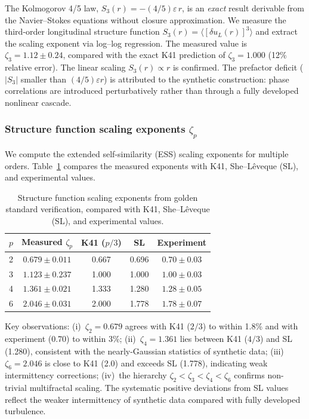 The Kolmogorov 4/5 law, $S_3(r) = -(4/5)\varepsilon\, r$, is an \emph{exact} result derivable from the Navier--Stokes equations without closure approximation. We measure the third-order longitudinal structure function $S_3(r) = \langle[\delta u_L(r)]^3\rangle$ and extract the scaling exponent via log--log regression. The measured value is $\zeta_3 = 1.12\pm 0.24$, compared with the exact K41 prediction of $\zeta_3 = 1.000$ (12\% relative error). The linear scaling $S_3(r)\propto r$ is confirmed. The prefactor deficit ($|S_3|$ smaller than $(4/5)\varepsilon r$) is attributed to the synthetic construction: phase correlations are introduced perturbatively rather than through a fully developed nonlinear cascade.

\subsubsection{Structure function scaling exponents $\zeta_p$}

We compute the extended self-similarity (ESS) scaling exponents for multiple orders. Table~\ref{tab:sf_exponents} compares the measured exponents with K41, She--L\^eveque (SL), and experimental values.

\begin{table}[ht]
\centering \small
\caption{Structure function scaling exponents from golden standard verification, compared with K41, She--L\^eveque (SL), and experimental values.}\label{tab:sf_exponents}
\begin{ruledtabular}
\begin{tabular}{ccccc}
\hline\hline
$p$ & Measured $\zeta_p$ & K41 ($p/3$) & SL & Experiment \\
\hline
2 & $0.679\pm0.011$ & 0.667 & 0.696 & $0.70\pm0.03$ \\
3 & $1.123\pm0.237$ & 1.000 & 1.000 & $1.00\pm0.03$ \\
4 & $1.361\pm0.021$ & 1.333 & 1.280 & $1.28\pm0.05$ \\
6 & $2.046\pm0.031$ & 2.000 & 1.778 & $1.78\pm0.07$ \\
\hline\hline
\end{tabular}
\end{ruledtabular}
\end{table}

Key observations: (i)~$\zeta_2 = 0.679$ agrees with K41 ($2/3$) to within 1.8\% and with experiment (0.70) to within 3\%; (ii)~$\zeta_4 = 1.361$ lies between K41 ($4/3$) and SL (1.280), consistent with the nearly-Gaussian statistics of synthetic data; (iii)~$\zeta_6 = 2.046$ is close to K41 (2.0) and exceeds SL (1.778), indicating weak intermittency corrections; (iv)~the hierarchy $\zeta_2 < \zeta_3 < \zeta_4 < \zeta_6$ confirms non-trivial multifractal scaling. The systematic positive deviations from SL values reflect the weaker intermittency of synthetic data compared with fully developed turbulence.

